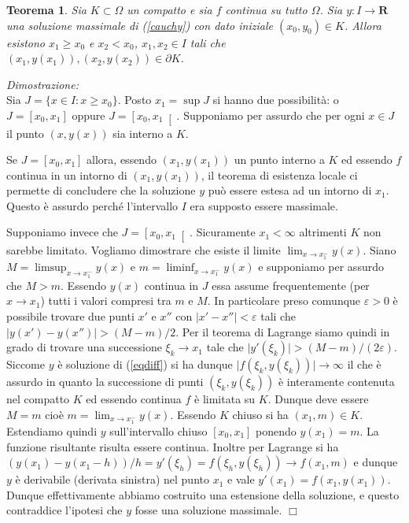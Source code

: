 \documentclass[italian,a4paper]{article}
\newcommand{\R}{\mathbf{R}}
\renewcommand{\epsilon}{\varepsilon}
\newtheorem{theorem}{Teorema}[section]
\def\profname{Dimostrazione}
\newenvironment{proof}
        {%
                {}%
                {%
                }%
        \noindent%
        {\it \profname:}\\%
        }%
        {%
        \hfill $\Box$%
        }
\begin{document}
\begin{theorem}\label{esce}
Sia $K\subset\Omega$ un compatto e sia $f$ continua su tutto $\Omega$.
Sia $y:I\to\R$ una soluzione massimale di (\ref{cauchy}) con dato iniziale
$(x_0,y_0)\in K$. 
Allora esistono $x_1\ge x_0$ e $x_2<x_0$, $x_1,x_2\in I$ tali
che $(x_1,y(x_1)),(x_2,y(x_2))\in\partial K$.
\end{theorem}
\begin{proof}
Sia $J=\{x\in I : x\ge x_0\}$.
Posto $x_1=\sup J$ si hanno due
possibilit\`a: o $J=[x_0,x_1]$ oppure $J=\left[x_0,x_1\right[$.
Supponiamo per assurdo che per ogni $x\in J$ il punto
$(x,y(x))$ sia interno a $K$. 

Se $J=[x_0,x_1]$ allora, essendo $(x_1,y(x_1))$ un punto interno a
$K$ ed essendo $f$ continua in un intorno di $(x_1,y(x_1))$, 
il teorema di esistenza locale ci
permette di concludere che la soluzione $y$ pu\`o essere estesa ad un
intorno di $x_1$. Questo \`e assurdo perch\'e l'intervallo $I$ era
supposto essere massimale.

Supponiamo invece che $J=\left[x_0,x_1\right[$. Sicuramente
$x_1<\infty$ altrimenti $K$ non sarebbe limitato. Vogliamo dimostrare
che esiste il limite $\displaystyle \lim_{x\to x_1^-} y(x)$. Siano $\displaystyle M=\limsup_{x\to
x_1^-} y(x)$ e $\displaystyle m=\liminf_{x\to x_1^-} y(x)$ e supponiamo per assurdo
che $M>m$. Essendo $y(x)$ continua in $J$ essa assume frequentemente
(per $x\to x_1$) tutti i valori compresi tra $m$ e $M$. In particolare
preso comunque $\epsilon>0$ \`e possibile trovare due punti $x'$ e
$x''$ con $\vert x'-x'' \vert <\epsilon$ tali che $\vert y(x') -
y(x'')\vert > (M-m)/2$. Per il teorema di Lagrange siamo quindi in
grado di trovare una successione $\xi_k\to x_1$ tale che 
$\vert y'(\xi_k)\vert > (M-m)/(2\epsilon)$. 
Siccome $y$ \`e soluzione di (\ref{eqdiff}) si ha dunque 
$\vert f(\xi_k,y(\xi_k))\vert \to\infty$ il che \`e assurdo in quanto la
successione di punti $(\xi_k,y(\xi_k))$ \`e interamente contenuta nel
compatto $K$ ed essendo continua $f$ \`e limitata su $K$.
Dunque deve essere $M=m$ cio\`e $m=\lim_{x\to x_1^-}y(x)$. Essendo $K$
chiuso si ha $(x_1,m)\in K$. Estendiamo quindi $y$ sull'intervallo
chiuso $[x_0,x_1]$ ponendo $y(x_1)=m$. La funzione risultante risulta
essere continua. Inoltre per Lagrange si ha
$(y(x_1)-y(x_1-h))/h = y'(\xi_h) = f(\xi_h,y(\xi_h))\to f(x_1,m)$ e
dunque $y$ \`e derivabile (derivata sinistra) nel punto $x_1$ e vale
$y'(x_1)=f(x_1,y(x_1))$. Dunque effettivamente abbiamo costruito una
estensione della soluzione, e questo contraddice l'ipotesi che $y$
fosse una soluzione massimale.
\end{proof}
\end{document}

